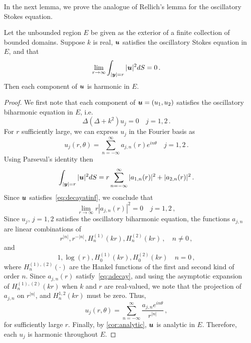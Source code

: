In the next lemma, we prove the analogue of Rellich's lemma for the
oscillatory Stokes equation. 
\begin{lem}
  \label{lem:rellich}
  Let the unbounded region $E$ be given as the exterior
  of a finite collection of bounded domains.
  Suppose $k$ is real, ${\boldsymbol u}$ satisfies the oscillatory
  Stokes equation in $E$, and that 
\begin{equation}
\lim_{r \to \infty} \int_{|{\boldsymbol y}|=r} |{\boldsymbol u}|^2 dS = 0 
\, . \label{eq:decayatinf}
\end{equation}
Then each component of ${\boldsymbol u}$ is harmonic in $E$.
\end{lem}
\begin{proof}
We first note that each component of ${\boldsymbol u}= (u_{1},u_{2})$ satisfies the 
oscillatory biharmonic equation in $E$, i.e.
\begin{equation}
\Delta (\Delta + k^2) u_{j} = 0 \quad j=1,2 \,. \nonumber
\end{equation}
For $r$ sufficiently large, we can express $u_{j}$ in the Fourier basis as
\begin{equation}
u_{j}(r,\theta) = \sum_{n=-\infty}^{\infty} a_{j,n}(r) e^{i n \theta}  \quad 
j=1,2 \, . \nonumber
\end{equation}
Using Parseval's identity then
\begin{equation}
\int_{|{\boldsymbol y}|=r} |{\boldsymbol u}|^2 dS = r\sum_{n=-\infty}^{\infty} |a_{1,n}(r)|^2  +
|a_{2,n}(r)|^2 \, . \nonumber
\end{equation}
Since ${\boldsymbol u}$ satisfies~\cref{eq:decayatinf}, we conclude that
\begin{equation}
\lim_{r\to\infty} r|a_{j,n}(r)|^2 = 0 \quad j=1,2 \, , \label{eq:adecay}
\end{equation}
Since $u_{j}$, $j=1,2$ satisfies the oscillatory biharmonic equation,
the functions $a_{j,n}$ are linear combinations of 
\begin{equation}
r^{|n|}, r^{-|n|}, H^{(1)}_{n}(k r), H^{(2)}_{n}(k r) \, , \quad
n\neq 0 \, , \nonumber
\end{equation}
and
\begin{equation}
1, \log{(r)}, H^{(1)}_{0}(k r), H^{(2)}_{0}(k r) \quad n=0 \, ,  \nonumber
\end{equation} 
where $H_{n}^{(1),(2)}(\cdot)$ are the Hankel functions of the first and
second kind of order $n$.
Since $a_{j,n}(r)$ satisfy~\cref{eq:adecay}, and using the asymptotic 
expansion of $H_{n}^{(1),(2)}(kr)$ when $k$ and $r$ are real-valued, we note
that the projection of $a_{j,n}$ on $r^{|n|}$, and $H_{n}^{1,2}(k r)$
must be zero. Thus, 
\begin{equation}
u_{j}(r,\theta) = \sum_{n=-\infty}^{\infty} \frac{a_{j,n} e^{i n \theta}}{r^{|n|}} 
\, , \nonumber
\end{equation}
for sufficiently large $r$.
Finally, by \cref{cor:analytic}, ${\boldsymbol u}$ is
analytic in $E$. Therefore, each $u_j$ is harmonic
throughout $E$.
\end{proof}

